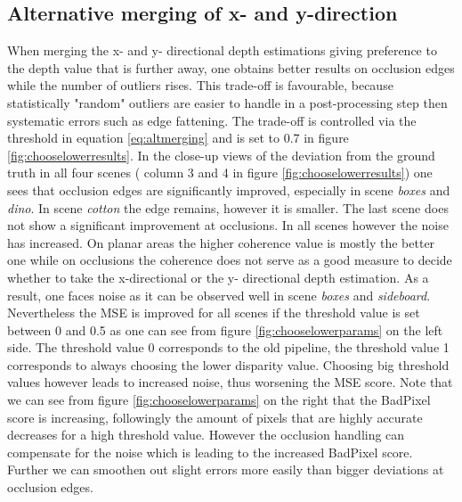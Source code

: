 \documentclass  [
  paper    = a4,
  BCOR     = 10mm,
  twoside,
  fontsize = 12pt,
  fleqn,
  toc      = bibnumbered,
  toc      = listofnumbered,
  numbers  = noendperiod,
  headings = normal,
  listof   = leveldown,
  version  = 3.03
]                                       {scrreprt}
\begin{document}
\subsection{Alternative merging of x- and y-direction}
\label{sec:ev_merging}
When merging the x- and y- directional depth estimations giving  preference to the depth value that is further away, one obtains better results on occlusion edges while the number of outliers rises. This trade-off is favourable, because statistically "random" outliers are easier to handle in a post-processing step then systematic errors such as edge fattening. The trade-off is controlled via the threshold in equation \ref{eq:altmerging} and is set to 0.7 in figure \ref{fig:chooselowerresults}. In the close-up views of the deviation from the ground truth in all four scenes ( column 3 and 4 in figure \ref{fig:chooselowerresults}) one sees that occlusion edges are significantly improved, especially in scene \textit{boxes} and \textit{dino}. In scene \textit{cotton} the edge remains, however it is smaller. The last scene does not show a significant improvement at occlusions. In all scenes however the noise has increased. On planar areas the higher coherence value is mostly the better one while on occlusions the coherence does not serve as a good measure to decide whether to take the x-directional or the y- directional depth estimation. As a result, one faces noise as it can be observed well in scene \textit{boxes} and \textit{sideboard}. \\
Nevertheless the MSE is improved for all scenes if the threshold value is set between 0 and 0.5 as one can see from figure \ref{fig:chooselowerparams} on the left side. The threshold value 0 corresponds to the old pipeline, the threshold value 1 corresponds to always choosing the lower disparity value. Choosing big threshold values however leads to increased noise, thus worsening the MSE score. Note that we can see from figure \ref{fig:chooselowerparams} on the right that the BadPixel score is increasing, followingly the amount of pixels that are highly accurate decreases for a high threshold value. However the occlusion handling can compensate for the noise which is leading to the increased BadPixel score. Further we can smoothen out slight errors more easily than bigger deviations at occlusion edges.\\
\end{document}
